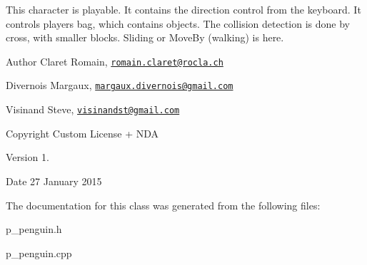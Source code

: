 This character is playable. It contains the direction control from the keyboard. It controls player\textquotesingle{}s bag, which contains objects. The collision detection is done by cross, with smaller blocks. Sliding or Move\+By (walking) is here. \begin{DoxyAuthor}{Author}
Claret Romain, \href{mailto:romain.claret@rocla.ch}{\tt romain.\+claret@rocla.\+ch} 

Divernois Margaux, \href{mailto:margaux.divernois@gmail.com}{\tt margaux.\+divernois@gmail.\+com} 

Visinand Steve, \href{mailto:visinandst@gmail.com}{\tt visinandst@gmail.\+com} 
\end{DoxyAuthor}
\begin{DoxyCopyright}{Copyright}
Custom License + N\+D\+A 
\end{DoxyCopyright}
\begin{DoxyVersion}{Version}
1. 
\end{DoxyVersion}
\begin{DoxyDate}{Date}
27 January 2015 
\end{DoxyDate}


The documentation for this class was generated from the following files\+:\begin{DoxyCompactItemize}
\item 
p\+\_\+penguin.\+h\item 
p\+\_\+penguin.\+cpp\end{DoxyCompactItemize}
